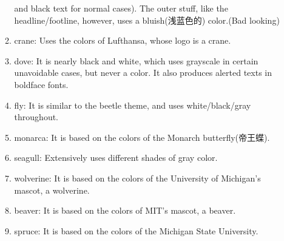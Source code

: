 \documentclass{beamer}
\begin{document}
\begin{frame}
\begin{enumerate}[I]
\begin{enumerate}
and black text for normal cases). The outer stuff, like the headline/footline, however,
uses a bluish(浅蓝色的) color.(Bad looking)
\item crane: Uses the colors of Lufthansa, whose logo is a crane.
\item dove: It is nearly black and white, which uses grayscale in certain unavoidable cases, but
never a color. It also produces alerted texts in boldface fonts.
\item fly: It is similar to the beetle theme, and uses white/black/gray throughout.
\item monarca: It is based on the colors of the Monarch butterfly(帝王蝶).
\item seagull: Extensively uses different shades of gray color.
\item wolverine: It is based on the colors of the University of Michigan’s mascot, a wolverine.
\item beaver: It is based on the colors of MIT’s mascot, a beaver.
\item spruce: It is based on the colors of the Michigan State University.
\end{enumerate}
\end{enumerate}
\end{frame}

\end{document}
